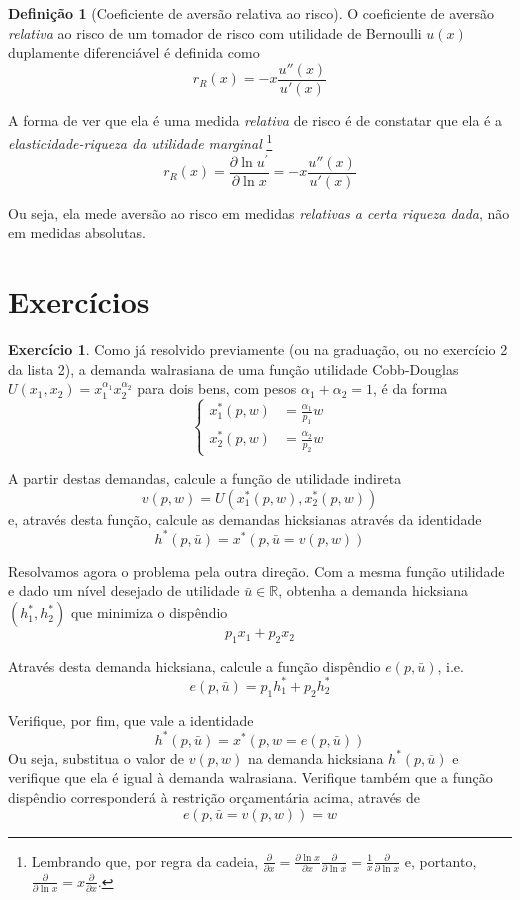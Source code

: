 \documentclass[12pt]{article}
\numberwithin{equation}{section}
\theoremstyle{plain}
\theoremstyle{definition}
\newtheorem{definition}[theorem]{Definição}
\newtheorem{exercise}{Exercício}
\theoremstyle{remark}
\begin{document}
\begin{definition}[Coeficiente de aversão relativa ao risco]
  O coeficiente de aversão \textit{relativa} ao risco de um tomador de risco com utilidade de Bernoulli $u(x)$ duplamente diferenciável é definida como
  $$
  r_{R}(x) = -x \frac{u''(x)}{u'(x)}
  $$
  
  A forma de ver que ela é uma medida \textit{relativa} de risco é de constatar que ela é a \textit{elasticidade-riqueza da utilidade marginal} \parencite[p. 94]{Arrow1974}\footnote{Lembrando que, por regra da cadeia, $\frac{ \partial  }{ \partial x } = \frac{ \partial \ln x }{ \partial x } \frac{ \partial  }{ \partial \ln x } = \frac{1}{x} \frac{ \partial  }{ \partial \ln x }$ e, portanto, $\frac{ \partial  }{ \partial \ln x } = x \frac{ \partial  }{ \partial x }$.}
  $$
  r_{R}(x) = \frac{\partial \ln u^{\prime} }{\partial \ln x} =  -x \frac{u''(x)}{u'(x)}
  $$

  Ou seja, ela mede aversão ao risco em medidas \textit{relativas a certa riqueza dada}, não em medidas absolutas. 

\end{definition}


\section{Exercícios}\label{exercuxedcios}
\begin{exercise}
  Como já resolvido previamente (ou na graduação, ou no exercício 2 da lista 2), a demanda walrasiana de uma função utilidade Cobb-Douglas $U(x_1, x_2) = x_1^{\alpha_1} x_2^{\alpha_2}$ para dois bens, com pesos $\alpha_1 + \alpha_2 = 1$, é da forma
  \[
  \begin{cases}
    x_1^*(p, w) &= \frac{\alpha_1}{p_1} w \\
    x_2^*(p, w) &= \frac{\alpha_2}{p_2} w
  \end{cases}
  \]

  A partir destas demandas, calcule a função de utilidade indireta
  \[
  v(p, w) = U(x_1^*(p, w), x_2^*(p, w))
  \]
  e, através desta função, calcule as demandas hicksianas através da identidade 
  \[
  h^*(p, \bar{u}) = x^*(p, \bar{u} = v(p, w))
  \]

  Resolvamos agora o problema pela outra direção. Com a mesma função utilidade e dado um nível desejado de utilidade $\bar{u} \in \mathbb{R}$, obtenha a demanda hicksiana $(h_1^*, h_2^*)$ que minimiza o dispêndio
  \[
  p_1 x_1 + p_2 x_2
  \]

  Através desta demanda hicksiana, calcule a função dispêndio $e(p, \bar{u})$, i.e.
  \[
  e(p, \bar{u}) = p_1 h_1^* + p_2 h_2^*  
  \]  
  
  Verifique, por fim, que vale a identidade
  \[
  h^*(p, \bar{u}) = x^*(p, w = e(p, \bar{u}))
  \]
  Ou seja, substitua o valor de $v(p, w)$ na demanda hicksiana $h^*(p, \overline{u})$ e verifique que ela é igual à demanda walrasiana. Verifique também que a função dispêndio corresponderá à restrição orçamentária acima, através de
  \[
  e(p, \bar{u} = v(p, w)) = w
  \]
\end{exercise}
\end{document}
